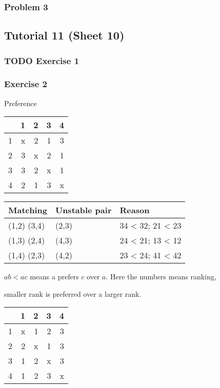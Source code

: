 \documentclass[11pt]{article}
\begin{document}
\subsubsection{Problem 3}
\label{sec:org217f8df}
\subsection{Tutorial 11 (Sheet 10)}
\label{sec:org2113778}
\subsubsection{{\bfseries\sffamily TODO} Exercise 1}
\label{sec:orgd0ed465}
\subsubsection{Exercise 2}
\label{sec:orgd888327}
Preference

\begin{center}
\begin{tabular}{rrrrr}
 & 1 & 2 & 3 & 4\\
\hline
1 & x & 2 & 1 & 3\\
2 & 3 & x & 2 & 1\\
3 & 3 & 2 & x & 1\\
4 & 2 & 1 & 3 & x\\
\end{tabular}
\end{center}

\begin{center}
\begin{tabular}{lll}
Matching & Unstable pair & Reason\\
\hline
(1,2) (3,4) & (2,3) & 34 < 32; 21 < 23\\
(1,3) (2,4) & (4,3) & 24 < 21; 13 < 12\\
(1,4) (2,3) & (4,2) & 23 < 24; 41 < 42\\
\end{tabular}
\end{center}


\(ab < ac\) means a prefers \(c\) over \(a\). Here the numbers means ranking,

smaller rank is preferred over a larger rank.

\begin{center}
\begin{tabular}{rrrrr}
 & 1 & 2 & 3 & 4\\
\hline
1 & x & 1 & 2 & 3\\
2 & 2 & x & 1 & 3\\
3 & 1 & 2 & x & 3\\
4 & 1 & 2 & 3 & x\\
\end{tabular}
\end{center}
\end{document}

